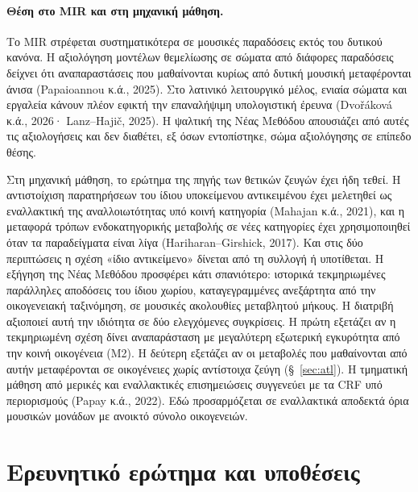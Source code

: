 \documentclass[11pt,a4paper]{article}
\begin{document}
\paragraph{Θέση στο MIR και στη μηχανική μάθηση.} Το MIR στρέφεται συστηματικότερα σε μουσικές παραδόσεις εκτός του δυτικού κανόνα. Η αξιολόγηση μοντέλων θεμελίωσης σε σώματα από διάφορες παραδόσεις δείχνει ότι αναπαραστάσεις που μαθαίνονται κυρίως από δυτική μουσική μεταφέρονται άνισα (Papaioannou κ.ά., 2025). Στο λατινικό λειτουργικό μέλος, ενιαία σώματα και εργαλεία κάνουν πλέον εφικτή την επαναλήψιμη υπολογιστική έρευνα (Dvořáková κ.ά., 2026· Lanz--Hajič, 2025). Η ψαλτική της Νέας Μεθόδου απουσιάζει από αυτές τις αξιολογήσεις και δεν διαθέτει, εξ όσων εντοπίστηκε, σώμα αξιολόγησης σε επίπεδο θέσης.

Στη μηχανική μάθηση, το ερώτημα της πηγής των θετικών ζευγών έχει ήδη τεθεί. Η αντιστοίχιση παρατηρήσεων του ίδιου υποκείμενου αντικειμένου έχει μελετηθεί ως εναλλακτική της αναλλοιωτότητας υπό κοινή κατηγορία (Mahajan κ.ά., 2021), και η μεταφορά τρόπων ενδοκατηγορικής μεταβολής σε νέες κατηγορίες έχει χρησιμοποιηθεί όταν τα παραδείγματα είναι λίγα (Hariharan--Girshick, 2017). Και στις δύο περιπτώσεις η σχέση «ίδιο αντικείμενο» δίνεται από τη συλλογή ή υποτίθεται. Η εξήγηση της Νέας Μεθόδου προσφέρει κάτι σπανιότερο: ιστορικά τεκμηριωμένες παράλληλες αποδόσεις του ίδιου χωρίου, καταγεγραμμένες ανεξάρτητα από την οικογενειακή ταξινόμηση, σε μουσικές ακολουθίες μεταβλητού μήκους. Η διατριβή αξιοποιεί αυτή την ιδιότητα σε δύο ελεγχόμενες συγκρίσεις. Η πρώτη εξετάζει αν η τεκμηριωμένη σχέση δίνει αναπαράσταση με μεγαλύτερη εξωτερική εγκυρότητα από την κοινή οικογένεια (M2). Η δεύτερη εξετάζει αν οι μεταβολές που μαθαίνονται από αυτήν μεταφέρονται σε οικογένειες χωρίς αντίστοιχα ζεύγη (§~\ref{sec:atl}). Η τμηματική μάθηση από μερικές και εναλλακτικές επισημειώσεις συγγενεύει με τα CRF υπό περιορισμούς (Papay κ.ά., 2022). Εδώ προσαρμόζεται σε εναλλακτικά αποδεκτά όρια μουσικών μονάδων με ανοικτό σύνολο οικογενειών.

\section{Ερευνητικό ερώτημα και υποθέσεις}
\end{document}
